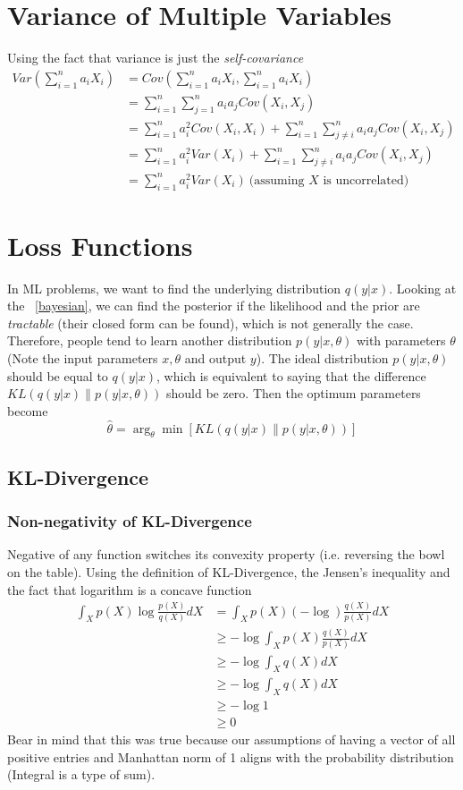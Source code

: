 \documentclass{book}
\numberwithin{equation}{subsection}
\begin{document}
\section{Variance of Multiple Variables}
Using the fact that variance is just the \textit{self-covariance}
\begin{align}
    Var(\sum_{i=1}^{n} a_i X_i) &= Cov(\sum_{i=1}^{n} a_i X_i, \sum_{i=1}^{n} a_i X_i)\\
    &= \sum_{i=1}^{n} \sum_{j=1}^{n} a_i a_j Cov(X_i, X_j)\\
    &= \sum_{i=1}^{n} a_i^2 Cov(X_i, X_i) + \sum_{i=1}^{n} \sum_{j \neq i}^{n} a_i a_j Cov(X_i, X_j)\\
    &= \sum_{i=1}^{n} a_i^2 Var(X_i) + \sum_{i=1}^{n} \sum_{j \neq i}^{n} a_i a_j Cov(X_i, X_j)\\
    &= \sum_{i=1}^{n} a_i^2 Var(X_i)\ \text{(assuming $X$ is uncorrelated)}\label{var_derivation_res}
\end{align}
\section{Loss Functions}
\label{lossfun}
In ML problems, we want to find the underlying distribution $q(y|x)$. Looking at the ~\ref{bayesian}, we can find the posterior if the likelihood and the prior are \textit{tractable} (their closed form can be found), which is not generally the case. Therefore, people tend to learn another distribution $p(y|x,\theta)$ with parameters $\theta$ (Note the input parameters $x, \theta$ and output $y$). The ideal distribution $p(y|x,\theta)$ should be equal to $q(y|x)$, which is equivalent to saying that the difference $KL(q(y|x)\parallel p(y|x,\theta))$ should be zero. Then the optimum parameters become
\begin{equation}
    \hat{\theta} 
    = \arg_\theta \min[KL(q(y|x) \parallel p(y|x,\theta))]
\end{equation}
\subsection{KL-Divergence}
\subsubsection{Non-negativity of KL-Divergence}
\label{kl_nonneg}
Negative of any function switches its convexity property (i.e. reversing the bowl on the table). Using the definition of KL-Divergence, the Jensen's inequality and the fact that logarithm is a concave function 
\begin{align}
     \int_X p(X)\log\frac{p(X)}{q(X)} dX &= \int_X p(X)(-\log)\frac{q(X)}{p(X)} dX\\
     &\geq -\log \int_X p(X)\frac{q(X)}{p(X)} dX\\
     &\geq -\log \int_X q(X) dX\\
     &\geq -\log \int_X q(X) dX\\
     &\geq -\log 1 \\
     &\geq 0
\end{align}
Bear in mind that this was true because our assumptions of having a vector of all positive entries and Manhattan norm of 1 aligns with the probability distribution (Integral is a type of sum).
\end{document}
